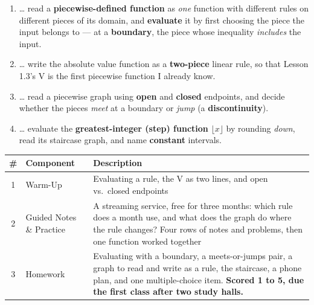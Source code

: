 \documentclass[12pt]{article}
\begin{document}

\namedateperiod
\vspace{0.18in}

\boxguard[14]
\begin{learningtargetbox}
\small
\begin{enumerate}[leftmargin=1.5em, itemsep=5pt]
  \item \ldots{} read a \textbf{piecewise-defined function} as \emph{one} function with different
        rules on different pieces of its domain, and \textbf{evaluate} it by first choosing the
        piece the input belongs to --- at a \textbf{boundary}, the piece whose inequality
        \emph{includes} the input.
  \item \ldots{} write the absolute value function as a \textbf{two-piece} linear rule, so that
        Lesson 1.3's V is the first piecewise function I already know.
  \item \ldots{} read a piecewise graph using \textbf{open} and \textbf{closed} endpoints, and
        decide whether the pieces \emph{meet} at a boundary or \emph{jump} (a
        \textbf{discontinuity}).
  \item \ldots{} evaluate the \textbf{greatest-integer (step) function} $\lfloor x\rfloor$ by
        rounding \emph{down}, read its staircase graph, and name \textbf{constant} intervals.
\end{enumerate}
\end{learningtargetbox}

\vspace{0.14in}

\boxguard[14]
\begin{tocbox}
\small
\renewcommand{\arraystretch}{1.5}
\begin{tabularx}{\linewidth}{@{} c l X @{}}
\rowcolor{forestbg}
\textbf{\#} & \textbf{Component} & \textbf{Description} \\
\midrule
1 & Warm-Up & Evaluating a rule, the V as two lines, and open vs.\ closed endpoints \\
2 & Guided Notes \& Practice & A streaming service, free for three months: which rule does a month
              use, and what does the graph do where the rule changes? Four rows of notes and problems, then one
              function worked together \\
3 & Homework & Evaluating with a boundary, a meets-or-jumps pair, a graph to read and write as a
              rule, the staircase, a phone plan, and one multiple-choice item. \textbf{Scored 1 to 5, due the first class after two study halls.} \\
\end{tabularx}
\end{tocbox}
\end{document}
